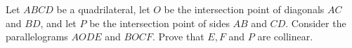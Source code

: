 Let $ABCD$ be a quadrilateral, let $O$ be the intersection point of diagonals $AC$ and $BD$, and let $P$ be the intersection point of sides $AB$ and $CD$. Consider the parallelograms $AODE$ and $BOCF$. Prove that $E, F$ and $P$ are collinear.